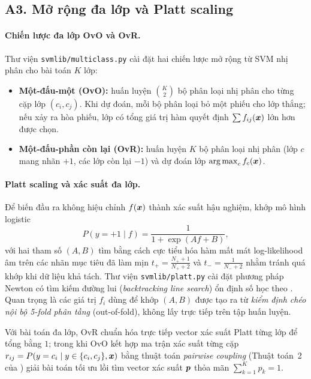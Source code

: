 \subsection{A3. Mở rộng đa lớp và Platt scaling}\label{sec:A3}

\paragraph{Chiến lược đa lớp OvO và OvR.}
Thư viện \texttt{svmlib/multiclass.py} cài đặt hai chiến lược mở rộng từ SVM nhị phân cho bài toán $K$ lớp:
\begin{itemize}
  \item \textbf{Một-đấu-một (OvO):} huấn luyện $\binom{K}{2}$ bộ phân loại nhị phân cho từng cặp lớp $(c_i, c_j)$. Khi dự đoán, mỗi bộ phân loại bỏ một phiếu cho lớp thắng; nếu xảy ra hòa phiếu, lớp có tổng giá trị hàm quyết định $\sum f_{ij}(\bm{x})$ lớn hơn được chọn.
  \item \textbf{Một-đấu-phần còn lại (OvR):} huấn luyện $K$ bộ phân loại nhị phân (lớp $c$ mang nhãn $+1$, các lớp còn lại $-1$) và dự đoán lớp $\operatorname*{arg\,max}_{c} f_c(\bm{x})$.
\end{itemize}

\paragraph{Platt scaling và xác suất đa lớp.}
Để biến đầu ra không hiệu chỉnh $f(\bm{x})$ thành xác suất hậu nghiệm, \citet{platt1999probabilistic} khớp mô hình logistic
\begin{equation}\label{eq:A3-platt}
  P(y = +1 \mid f) = \frac{1}{1 + \exp(A f + B)},
\end{equation}
với hai tham số $(A, B)$ tìm bằng cách cực tiểu hóa hàm mất mát log-likelihood âm trên các nhãn mục tiêu đã làm mịn $t_+ = \frac{N_+ + 1}{N_+ + 2}$ và $t_- = \frac{1}{N_- + 2}$ nhằm tránh quá khớp khi dữ liệu khả tách. Thư viện \texttt{svmlib/platt.py} cài đặt phương pháp Newton có tìm kiếm đường lui (\emph{backtracking line search}) ổn định số học theo \citet{lin2007note}. Quan trọng là các giá trị $f_i$ dùng để khớp $(A, B)$ được tạo ra từ \emph{kiểm định chéo nội bộ 5-fold phân tầng} (out-of-fold), không lấy trực tiếp trên tập huấn luyện.

Với bài toán đa lớp, OvR chuẩn hóa trực tiếp vector xác suất Platt từng lớp để tổng bằng $1$; trong khi OvO kết hợp ma trận xác suất từng cặp $r_{ij} = P(y = c_i \mid y \in \{c_i, c_j\}, \bm{x})$ bằng thuật toán \emph{pairwise coupling} (Thuật toán~2 của \citet{wu2004probability}) giải bài toán tối ưu lồi tìm vector xác suất $\bm{p}$ thỏa mãn $\sum_{k=1}^K p_k = 1$.

